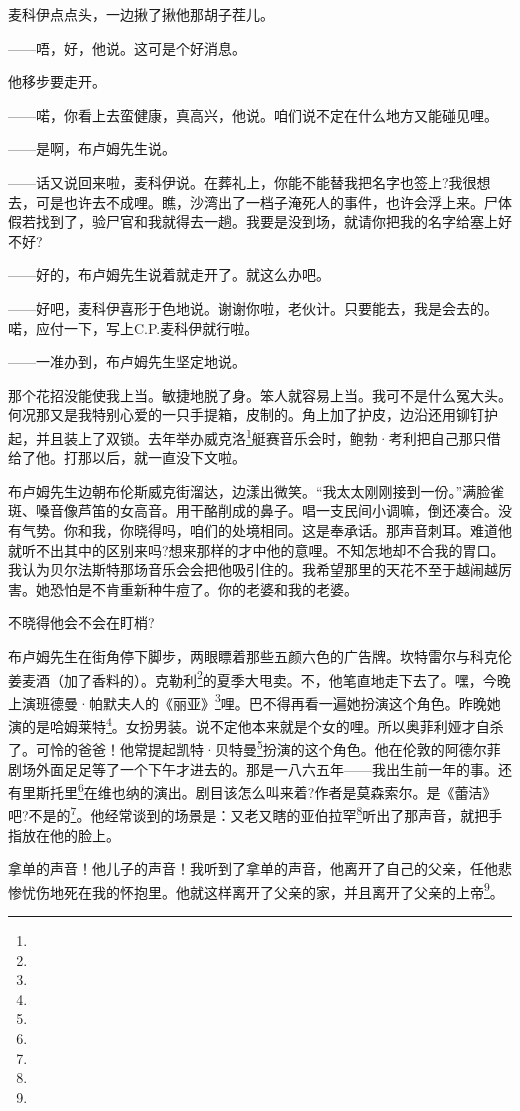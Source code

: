 \par 麦科伊点点头，一边揪了揪他那胡子茬儿。
\par ——唔，好，他说。这可是个好消息。
\par 他移步要走开。
\par ——喏，你看上去蛮健康，真高兴，他说。咱们说不定在什么地方又能碰见哩。
\par ——是啊，布卢姆先生说。
\par ——话又说回来啦，麦科伊说。在葬礼上，你能不能替我把名字也签上?我很想去，可是也许去不成哩。瞧，沙湾出了一档子淹死人的事件，也许会浮上来。尸体假若找到了，验尸官和我就得去一趟。我要是没到场，就请你把我的名字给塞上好不好?
\par ——好的，布卢姆先生说着就走开了。就这么办吧。
\par ——好吧，麦科伊喜形于色地说。谢谢你啦，老伙计。只要能去，我是会去的。喏，应付一下，写上C.P.麦科伊就行啦。
\par ——一准办到，布卢姆先生坚定地说。
\par 那个花招没能使我上当。敏捷地脱了身。笨人就容易上当。我可不是什么冤大头。何况那又是我特别心爱的一只手提箱，皮制的。角上加了护皮，边沿还用铆钉护起，并且装上了双锁。去年举办威克洛\footnote{}艇赛音乐会时，鲍勃·考利把自己那只借给了他。打那以后，就一直没下文啦。
\par 布卢姆先生边朝布伦斯威克街溜达，边漾出微笑。“我太太刚刚接到一份。”满脸雀斑、嗓音像芦笛的女高音。用干酪削成的鼻子。唱一支民间小调嘛，倒还凑合。没有气势。你和我，你晓得吗，咱们的处境相同。这是奉承话。那声音刺耳。难道他就听不出其中的区别来吗?想来那样的才中他的意哩。不知怎地却不合我的胃口。我认为贝尔法斯特那场音乐会会把他吸引住的。我希望那里的天花不至于越闹越厉害。她恐怕是不肯重新种牛痘了。你的老婆和我的老婆。
\par 不晓得他会不会在盯梢?
\par 布卢姆先生在街角停下脚步，两眼瞟着那些五颜六色的广告牌。坎特雷尔与科克伦姜麦酒（加了香料的）。克勒利\footnote{}的夏季大甩卖。不，他笔直地走下去了。嘿，今晚上演班德曼·帕默夫人的《丽亚》\footnote{}哩。巴不得再看一遍她扮演这个角色。昨晚她演的是哈姆莱特\footnote{}。女扮男装。说不定他本来就是个女的哩。所以奥菲利娅才自杀了。可怜的爸爸！他常提起凯特·贝特曼\footnote{}扮演的这个角色。他在伦敦的阿德尔菲剧场外面足足等了一个下午才进去的。那是一八六五年——我出生前一年的事。还有里斯托里\footnote{}在维也纳的演出。剧目该怎么叫来着?作者是莫森索尔。是《蕾洁》吧?不是的\footnote{}。他经常谈到的场景是：又老又瞎的亚伯拉罕\footnote{}听出了那声音，就把手指放在他的脸上。
\par 拿单的声音！他儿子的声音！我听到了拿单的声音，他离开了自己的父亲，任他悲惨忧伤地死在我的怀抱里。他就这样离开了父亲的家，并且离开了父亲的上帝\footnote{}。
